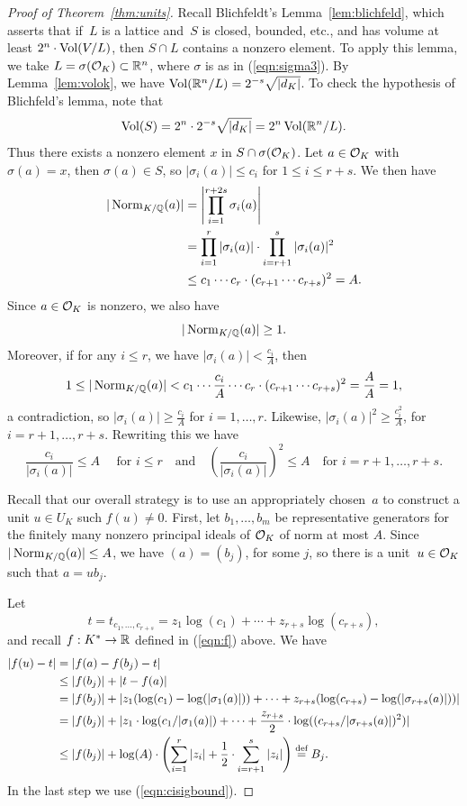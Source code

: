 \begin{proof}[Proof of Theorem~\ref{thm:units}]
Recall Blichfeldt's Lemma~\ref{lem:blichfeld}, which asserts  
that if~$L$ is a lattice and~$S$ is closed,
bounded, etc., and has volume at least $2^n\cdot \operatorname{Vol}(V/L)$, then
$S\cap L$ contains a nonzero element.   To apply this lemma, we
take $L=\sigma(\mathcal{O}_K)\subset \mathbb{R}^n$, where $\sigma$ is as in (\ref{eqn:sigma3}).
By Lemma~\ref{lem:volok}, 
we have
$\operatorname{Vol}(\mathbb{R}^n/L) = 2^{-s}\sqrt{|d_K|}$.  To check the hypothesis
of Blichfeld's lemma, note that 
$$
 \operatorname{Vol}(S) = 2^n \cdot 2^{-s} \sqrt{|d_K|} = 2^n \operatorname{Vol}(\mathbb{R}^n/L).
$$
Thus there exists a nonzero element $x$ in $S\cap \sigma(\mathcal{O}_K)$.
Let $a\in \mathcal{O}_K$ with $\sigma(a)=x$, then $\sigma(a)\in S$, so
$|\sigma_i(a)|\leq c_i$ for $1\leq i\leq r+s$.
We then have
\begin{align*}
  |\operatorname{Norm}_{K/\mathbb{Q}}(a)| &=
   \left|\prod_{i=1}^{r+2s} \sigma_i(a)\right|\\
   &=  \prod_{i=1}^r |\sigma_i(a)|\cdot \prod_{i=r+1}^s|\sigma_i(a)|^2\\
   &\leq c_1\cdots c_r\cdot (c_{r+1}\cdots c_{r+s})^2 = A.
\end{align*}
Since $a\in \mathcal{O}_K$ is nonzero, we also have
$$
 |\operatorname{Norm}_{K/\mathbb{Q}}(a)|\geq 1.
$$
Moreover, if for any $i\leq r$, we have $|\sigma_i(a)|< \frac{c_i}{A}$, then 
$$
 1\leq |\operatorname{Norm}_{K/\mathbb{Q}}(a)| < c_1\cdots \frac{c_i}{A}\cdots c_r \cdot (c_{r+1}\cdots c_{r+s})^2 = \frac{A}{A} = 1,
$$
a contradiction, so $|\sigma_i(a)|\geq \frac{c_i}{A}$ for $i=1,\ldots, r$. Likewise,
$|\sigma_i(a)|^2 \geq \frac{c_i^2}{A}$, for $i=r+1,\ldots, r+s$. 
Rewriting this 
we have 
\begin{equation}\label{eqn:cisigbound}
  \frac{c_i}{|\sigma_i(a)|}\leq A\quad\text{ for }i\leq r\quad\text{and}\quad
\left(\frac{c_i}{|\sigma_i(a)|}\right)^2\leq A\quad\text{for } i=r+1,\ldots, r+s.
\end{equation}

Recall that our overall strategy is to use an appropriately chosen~$a$
to construct a unit $u\in U_K$ such $f(u)\neq 0$.  First, let
$b_1,\ldots, b_m$ be representative generators for the finitely many
nonzero principal ideals of $\mathcal{O}_K$ of norm at most $A$.  Since
$|\operatorname{Norm}_{K/\mathbb{Q}}(a)|\leq A$, we have $(a)=(b_j)$, for some $j$, so there
is a unit~$u\in \mathcal{O}_K$ such that $a=u b_j$.

Let 
$$
t = t_{c_1,\ldots, c_{r+s}} = z_1\log(c_1)+\cdots +z_{r+s}\log(c_{r+s}),
$$ 
and recall $f:K^*\to \mathbb{R}$ defined in
(\ref{eqn:f}) above.
We have
\begin{align*}
  |f(u) - t| &= |f(a) - f(b_j) - t|\\
   &\leq |f(b_j)| + |t - f(a)|\\
   &=|f(b_j)| + |z_1(\log(c_1) - \log(|\sigma_1(a)|)) + \cdots + z_{r+s}(\log(c_{r+s}) - \log(|\sigma_{r+s}(a)|))|\\
   &=|f(b_j)| + |z_1\cdot \log(c_1/|\sigma_1(a)|) + \cdots + \frac{z_{r+s}}{2}\cdot \log((c_{r+s}/|\sigma_{r+s}(a)|)^2)|\\
   &\leq |f(b_j)| + \log(A)\cdot\left(\sum_{i=1}^{r}|z_i| + \frac{1}{2}\cdot \sum_{i=r+1}^s|z_i|\right) \defeq B_j.
\end{align*}
In the last step we use (\ref{eqn:cisigbound}).


\end{proof}
